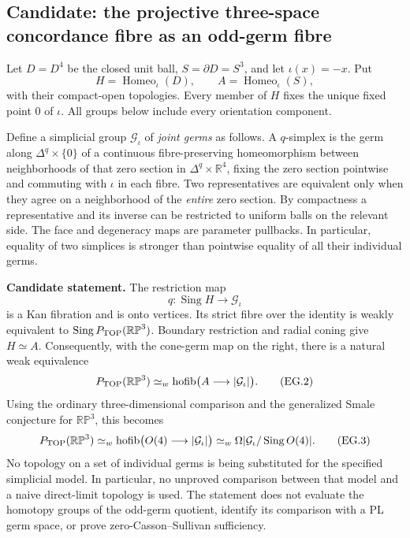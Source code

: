\subsection*{Candidate: the projective three-space concordance fibre as an odd-germ fibre}

Let $D=D^4$ be the closed unit ball, $S=\partial D=S^3$, and let
$\iota(x)=-x$. Put
\[
 H=\operatorname{Homeo}_{\iota}(D),\qquad
 A=\operatorname{Homeo}_{\iota}(S),
\]
with their compact-open topologies. Every member of $H$ fixes the unique
fixed point $0$ of $\iota$. All groups below include every orientation
component.

Define a simplicial group $\mathcal G_{\iota}$ of \emph{joint germs} as follows.
A $q$-simplex is the germ along $\Delta^q\times\{0\}$ of a continuous
fibre-preserving homeomorphism between neighborhoods of that zero section
in $\Delta^q\times\mathbb R^4$, fixing the zero section pointwise and
commuting with $\iota$ in each fibre. Two representatives are equivalent
only when they agree on a neighborhood of the \emph{entire} zero section.
By compactness a representative and its inverse can be restricted to
uniform balls on the relevant side. The face and degeneracy maps are
parameter pullbacks. In particular, equality of two simplices is stronger
than pointwise equality of all their individual germs.

\textbf{Candidate statement.}\quad
The restriction map
\[
 q:\operatorname{Sing}H\longrightarrow\mathcal G_{\iota}
 \tag{EG.1}
\]
is a Kan fibration and is onto vertices. Its strict fibre over the identity
is weakly equivalent to $\operatorname{Sing}P_{\rm TOP}(\mathbb {RP}^3)$.
Boundary restriction and radial coning give $H\simeq A$. Consequently,
with the cone-germ map on the right, there is a natural weak equivalence
\[
 P_{\rm TOP}(\mathbb {RP}^3)
 \simeq_w\operatorname{hofib}\bigl(A\longrightarrow|\mathcal G_{\iota}|\bigr).
 \tag{EG.2}
\]
Using the ordinary three-dimensional comparison and the generalized
Smale conjecture for $\mathbb {RP}^3$, this becomes
\[
 P_{\rm TOP}(\mathbb {RP}^3)
 \simeq_w\operatorname{hofib}\bigl(O(4)\longrightarrow|\mathcal G_{\iota}|\bigr)
 \simeq_w\Omega|\mathcal G_{\iota}/\operatorname{Sing}O(4)|.
 \tag{EG.3}
\]
No topology on a set of individual germs is being substituted for the
specified simplicial model. In particular, no unproved comparison between
that model and a naive direct-limit topology is used. The statement does
not evaluate the homotopy groups of the odd-germ quotient, identify its
comparison with a PL germ space, or prove zero-Casson--Sullivan sufficiency.

